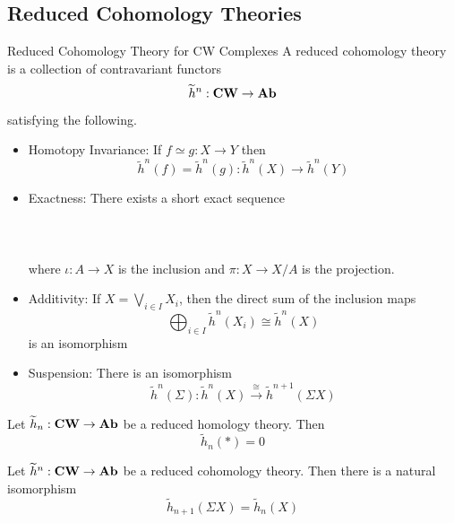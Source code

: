 \documentclass[a4paper]{article}
\begin{document}
\subsection{Reduced Cohomology Theories}
\begin{defn}{Reduced Cohomology Theory for CW Complexes}{} A reduced cohomology theory is a collection of contravariant functors $$\widetilde{h}^n:\bold{CW}\to\bold{Ab}$$ satisfying the following. 
\begin{itemize}
\item Homotopy Invariance: If $f\simeq g:X\to Y$ then $$\widetilde{h}^n(f)=\widetilde{h}^n(g):\widetilde{h}^n(X)\to\widetilde{h}^n(Y)$$
\item Exactness: There exists a short exact sequence \\~\\
\\~\\
where $\iota:A\to X$ is the inclusion and $\pi:X\to X/A$ is the projection. 
\item Additivity: If $X=\bigvee_{i\in I}X_i$, then the direct sum of the inclusion maps $$\bigoplus_{i\in I}\widetilde{h}^n(X_i)\cong\widetilde{h}^n(X)$$ is an isomorphism
\item Suspension: There is an isomorphism $$\widetilde{h}^n(\Sigma):\widetilde{h}^n(X)\overset{\cong}{\longrightarrow}\widetilde{h}^{n+1}(\Sigma X)$$
\end{itemize}
\end{defn}

\begin{lmm}{}{} Let $\widetilde{h}_n:\bold{CW}\to\bold{Ab}$ be a reduced homology theory. Then $$\widetilde{h}_n(\ast)=0$$
\end{lmm}

\begin{prp}{}{} Let $\widetilde{h}^n:\bold{CW}\to\bold{Ab}$ be a reduced cohomology theory. Then there is a natural isomorphism $$\widetilde{h}_{n+1}(\Sigma X)=\widetilde{h}_n(X)$$
\end{prp}
\end{document}
